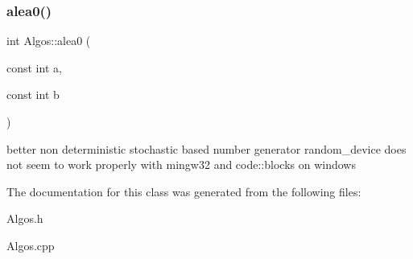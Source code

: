 \subsubsection{\texorpdfstring{alea0()}{alea0()}}
{\footnotesize\ttfamily int Algos\+::alea0 (\begin{DoxyParamCaption}\item[{const int}]{a,  }\item[{const int}]{b }\end{DoxyParamCaption})\hspace{0.3cm}{\ttfamily [static]}}

better non deterministic stochastic based number generator random\+\_\+device does not seem to work properly with mingw32 and code\+::blocks on windows 

The documentation for this class was generated from the following files\+:\begin{DoxyCompactItemize}
\item 
Algos.\+h\item 
Algos.\+cpp\end{DoxyCompactItemize}
